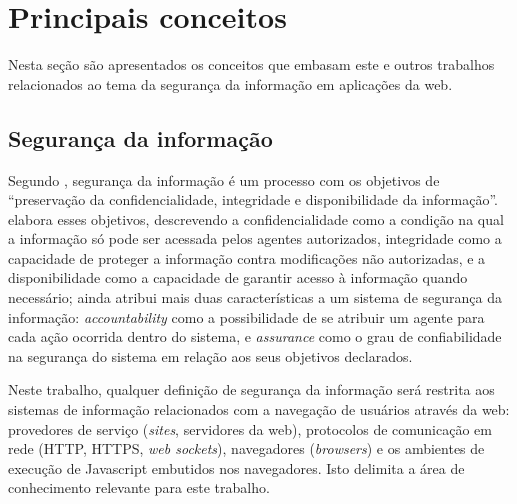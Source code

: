 \section{Principais conceitos}
Nesta seção são apresentados os conceitos que embasam este e outros trabalhos relacionados ao tema da segurança da informação em aplicações da web.

\subsection{Segurança da informação}
Segundo \cite{ISO2016}, segurança da informação é um processo com os objetivos de ``preservação da confidencialidade, integridade e disponibilidade da informação''. \cite{Foster1998} elabora esses objetivos, descrevendo a confidencialidade como a condição na qual a informação só pode ser acessada pelos agentes autorizados, integridade como a capacidade de proteger a informação contra modificações não autorizadas, e a disponibilidade como a capacidade de garantir acesso à informação quando necessário; \cite{Foster1998} ainda atribui mais duas características a um sistema de segurança da informação: \textit{accountability} como a possibilidade de se atribuir um agente para cada ação ocorrida dentro do sistema, e \textit{assurance} como o grau de confiabilidade na segurança do sistema em relação aos seus objetivos declarados.

Neste trabalho, qualquer definição de segurança da informação será restrita aos sistemas de informação relacionados com a navegação de usuários através da web: provedores de serviço (\textit{sites}, servidores da web), protocolos de comunicação em rede (HTTP, HTTPS, \textit{web sockets}), navegadores (\textit{browsers}) e os ambientes de execução de Javascript embutidos nos navegadores. Isto delimita a área de conhecimento relevante para este trabalho.

